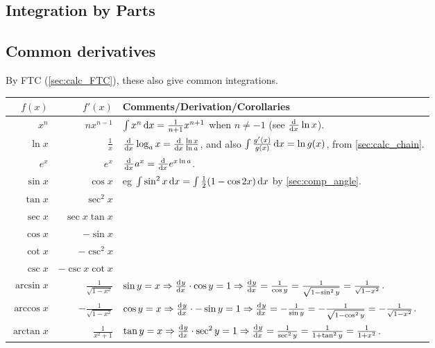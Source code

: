 \documentclass[a4paper,11pt]{article}
\begin{document}
    \subsection{Integration by Parts}

    \subsection{Common derivatives} \label{calc:common}


    By FTC (\ref{sec:calc_FTC}), these also give common integrations.

    \begin{center}
    \begin{longtable}{rrl}
    \toprule
    \boldmath$f(x)$ & \boldmath$f'(x)$ &
    \bfseries Comments/Derivation/Corollaries \\
    \midrule
    \endhead
    $x^n$ & $nx^{n-1}$
        & $\int x^n \dif x = \frac{1}{n + 1}x^{n + 1}$ when
          $n \neq -1$ (see $\od{}{x}\ln x$).\\
    $\ln x$ & $\frac{1}{x}$
        & $\od{}{x}\log_a x = \od{}{x} \frac{\ln x}{\ln a}$, and also
          $\int \frac{g'(x)}{g(x)} \dif x = \ln g(x)$,
            from \ref{sec:calc_chain}.\\
    $e^x$ & $e^x$ & $\od{}{x}a^x = \od{}{x}e^{x \ln a}$. \\
    $\sin x$ & $\cos x$
        & eg $\int \sin^2 x \dif x = \int \frac 12 (1 - \cos 2x) \dif x$
          by \ref{sec:comp_angle}. \\
    $\tan x$ & $\sec^2 x$ \\
    $\sec x$ & $\sec x \tan x$ \\
    $\cos x$ & $-\sin x$ \\
    $\cot x$ & $-\csc^2 x$ \\
    $\csc x$ & $-\csc x \cot x$ \\
    $\arcsin x$ & $\frac{1}{\sqrt{1 - x^2}}$
        & $\sin y = x \Rightarrow \od yx \cdot \cos y = 1 \Rightarrow
           \od yx = \frac{1}{\cos y}
         = \frac{1}{\sqrt{1 - \sin^2 y}} = \frac{1}{\sqrt{1 - x^2}}$. \\
    $\arccos x$ & $-\frac{1}{\sqrt{1 - x^2}}$
        & $\cos y = x \Rightarrow \od yx \cdot -\sin y = 1 \Rightarrow
           \od yx = -\frac{1}{\sin y}
         = -\frac{1}{\sqrt{1 - \cos^2 y}} = -\frac{1}{\sqrt{1 - x^2}}$. \\
    $\arctan x$ & $\frac{1}{x^2 + 1}$
        & $\tan y = x \Rightarrow \od yx \cdot \sec^2 y = 1 \Rightarrow
           \od yx = \frac{1}{\sec^2 y} = \frac{1}{1 + \tan^2 y}
         = \frac{1}{1 + x^2}$. \\
    \bottomrule
    \end{longtable}
    \end{center}
\end{document}
